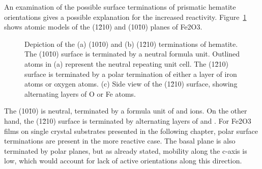 \documentclass[12pt,%
              twoside,
               letterpaper]{uiothesis}
\begin{document}
An examination of the possible surface terminations of prismatic hematite orientations
gives a possible explanation for the increased reactivity. Figure~\ref{fig:fe2o3terminations}
shows atomic models of the (1\={2}10) and (10\={1}0) planes of Fe2O3.
\begin{figure}[htbp]
\begin{center}
\caption[Depiction of the (10\={1}0) and (1\={2}10) terminations of hematite]{Depiction of
the (a) (10\={1}0) and (b) (1\={2}10) terminations of hematite. The (10\={1}0) surface is
terminated by a neutral formula unit. Outlined atoms in (a) represent the neutral
repeating  unit cell. The (1\={2}10) surface is terminated by a polar termination
of either a layer of iron atoms or oxygen atoms. (c) Side view of the (1\={2}10) surface,
showing alternating layers of O or Fe atoms.}
\label{fig:fe2o3terminations}
\end{center}
\end{figure}
The (10\={1}0) is neutral, terminated by a formula unit of  and 
ions. On the other hand, the (1\={2}10) surface is terminated by alternating layers of
 and . For Fe2O3 films on single crystal substrates presented
in the following chapter, polar surface terminations are present in the more reactive
case. The basal plane is also terminated by polar planes, but as already stated, mobility
along the c-axis is low, which would account for lack of active orientations along this
direction.
\end{document}
